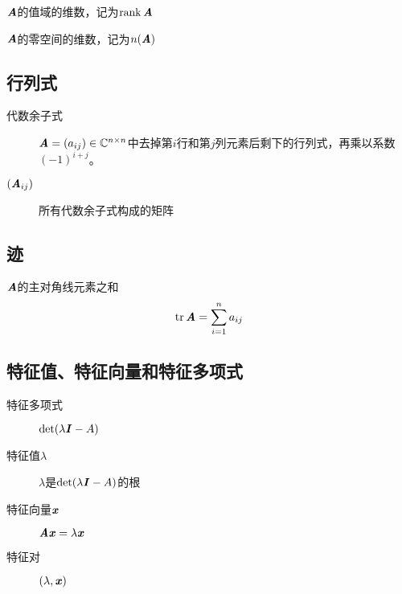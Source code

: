 \begin{definition}[秩]
    $\boldsymbol{\mathit{A}}$的值域的维数，记为$\mathrm{rank}\,\boldsymbol{\mathit{A}}$
\end{definition}

\begin{definition}[零度]
    $\boldsymbol{\mathit{A}}$的零空间的维数，记为$n(\boldsymbol{\mathit{A}})$
\end{definition}

\subsection{行列式}
\label{sub:行列式}

\begin{definition}
    \begin{description}
        \item[代数余子式] $\boldsymbol{\mathit{A}} = (a_{ij}) \in \mathbb{C}^{n \times n}$中去掉第$i$行和第$j$列元素后剩下的行列式，再乘以系数$(-1)^{i+j}$。
        \item[$(\boldsymbol{\mathit{A}}_{ij})$] 所有代数余子式构成的矩阵
    \end{description}
\end{definition}

\subsection{迹}
\label{sub:迹}

\begin{definition}[迹]
    $\boldsymbol{\mathit{A}}$的主对角线元素之和
    $$
    \mathrm{tr}\, \boldsymbol{\mathit{A}} = \sum_{i=1}^n a_{ij}
    $$
\end{definition}

\subsection{特征值、特征向量和特征多项式}
\label{sub:特征值、特征向量和特征多项式}

\begin{definition}
    \begin{description}
        \item[特征多项式] $\det(\lambda \boldsymbol{\mathit{I}} - A)$
        \item[特征值$\lambda$] $\lambda$是$\det(\lambda \boldsymbol{\mathit{I}} - A)$的根
        \item[特征向量$\boldsymbol{\mathit{x}}$] $\boldsymbol{\mathit{A}} \boldsymbol{\mathit{x}} = \lambda \boldsymbol{\mathit{x}}$
        \item[特征对] $(\lambda, \boldsymbol{\mathit{x}})$
    \end{description}
\end{definition}

